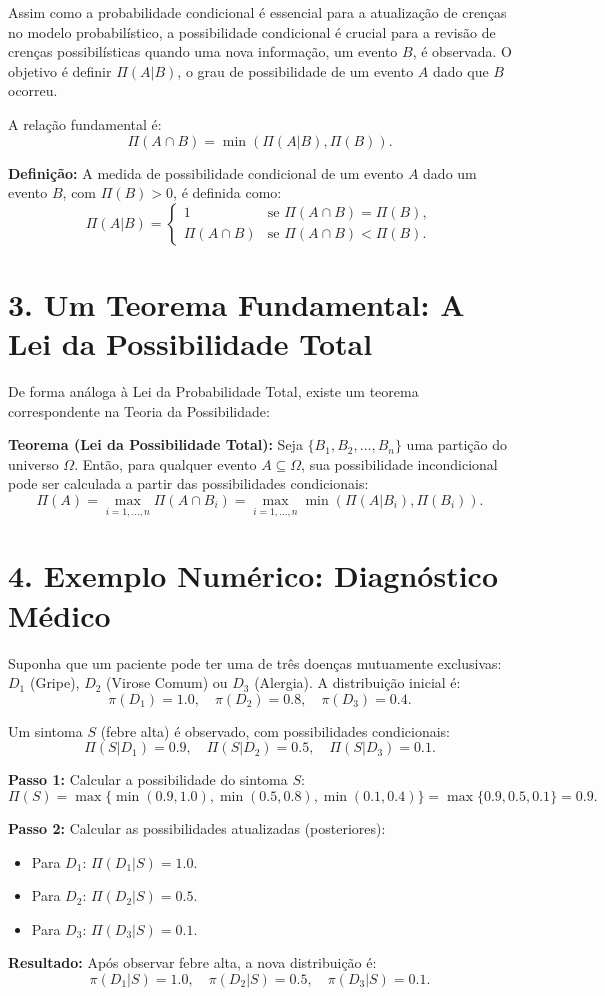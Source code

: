 \documentclass[a4paper]{article}
\begin{document}
\begin{answer}[Questão 01]
Assim como a probabilidade condicional é essencial para a atualização de crenças no modelo probabilístico, a possibilidade condicional é crucial para a revisão de crenças possibilísticas quando uma nova informação, um evento $B$, é observada. O objetivo é definir $\Pi(A|B)$, o grau de possibilidade de um evento $A$ dado que $B$ ocorreu.

A relação fundamental é:
\[
\Pi(A \cap B) = \min(\Pi(A|B), \Pi(B)).
\]

\textbf{Definição:} A medida de possibilidade condicional de um evento $A$ dado um evento $B$, com $\Pi(B) > 0$, é definida como:
\[
\Pi(A|B) =
\begin{cases}
1 & \text{se } \Pi(A \cap B) = \Pi(B), \\
\Pi(A \cap B) & \text{se } \Pi(A \cap B) < \Pi(B).
\end{cases}
\]

\section*{3. Um Teorema Fundamental: A Lei da Possibilidade Total}

De forma análoga à Lei da Probabilidade Total, existe um teorema correspondente na Teoria da Possibilidade:

\textbf{Teorema (Lei da Possibilidade Total):} Seja $\{B_1, B_2, \ldots, B_n\}$ uma partição do universo $\Omega$. Então, para qualquer evento $A \subseteq \Omega$, sua possibilidade incondicional pode ser calculada a partir das possibilidades condicionais:
\[
\Pi(A) = \max_{i=1,\ldots,n} \Pi(A \cap B_i) 
= \max_{i=1,\ldots,n} \min(\Pi(A|B_i), \Pi(B_i)).
\]

\section*{4. Exemplo Numérico: Diagnóstico Médico}

Suponha que um paciente pode ter uma de três doenças mutuamente exclusivas: $D_1$ (Gripe), $D_2$ (Virose Comum) ou $D_3$ (Alergia). A distribuição inicial é:
\[
\pi(D_1)=1.0, \quad \pi(D_2)=0.8, \quad \pi(D_3)=0.4.
\]

Um sintoma $S$ (febre alta) é observado, com possibilidades condicionais:
\[
\Pi(S|D_1)=0.9, \quad \Pi(S|D_2)=0.5, \quad \Pi(S|D_3)=0.1.
\]

\textbf{Passo 1:} Calcular a possibilidade do sintoma $S$:
\[
\Pi(S) = \max \{\min(0.9,1.0), \min(0.5,0.8), \min(0.1,0.4)\} 
= \max\{0.9,0.5,0.1\} = 0.9.
\]

\textbf{Passo 2:} Calcular as possibilidades atualizadas (posteriores):
\begin{itemize}
  \item Para $D_1$: $\Pi(D_1|S)=1.0$.
  \item Para $D_2$: $\Pi(D_2|S)=0.5$.
  \item Para $D_3$: $\Pi(D_3|S)=0.1$.
\end{itemize}

\textbf{Resultado:} Após observar febre alta, a nova distribuição é:
\[
\pi(D_1|S)=1.0, \quad \pi(D_2|S)=0.5, \quad \pi(D_3|S)=0.1.
\]

    \end{answer}
\end{document}
